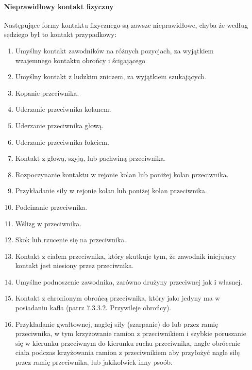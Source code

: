 \documentclass[12pt]{article}
\begin{document}
\paragraph{Nieprawidłowy kontakt fizyczny}
Następujące formy
kontaktu fizycznego są zawsze nieprawidłowe, chyba że według sędziego
był to kontakt przypadkowy:

\begin{enumerate}
	\item
	      Umyślny kontakt zawodników na różnych pozycjach, za wyjątkiem
	      wzajemnego kontaktu obrońcy i ścigającego
	\item
	      Umyślny kontakt z ludzkim zniczem, za wyjątkiem szukających.
	\item
	      Kopanie przeciwnika.
	\item
	      Uderzanie przeciwnika kolanem.
	\item
	      Uderzanie przeciwnika głową.
	\item
	      Uderzanie przeciwnika łokciem.
	\item
	      Kontakt z głową, szyją, lub pachwiną przeciwnika.
	\item
	      Rozpoczynanie kontaktu w rejonie kolan lub poniżej kolan przeciwnika.
	\item
	      Przykładanie siły w rejonie kolan lub poniżej kolan przeciwnika.
	\item
	      Podcinanie przeciwnika.
	\item
	      Wślizg w przeciwnika.
	\item
	      Skok lub rzucenie się na przeciwnika.
	\item
	      Kontakt z ciałem przeciwnika, który skutkuje tym, że zawodnik
	      inicjujący kontakt jest niesiony przez przeciwnika.
	\item
	      Umyślne podnoszenie zawodnika, zarówno drużyny przeciwnej jak i
	      własnej.
	\item
	      Kontakt z chronionym obrońcą przeciwnika, który jako jedyny ma w
	      posiadaniu kafla (patrz 7.3.3.2. Przywileje obrońcy).
	\item
	      Przykładanie gwałtownej, nagłej siły (szarpanie) do lub przez ramię
	      przeciwnika, w tym krzyżowanie ramion z przeciwnikiem i szybkie
	      poruszanie się w kierunku przeciwnym do kierunku ruchu przeciwnika,
	      nagłe obrócenie ciała podczas krzyżowania ramion z przeciwnikiem aby
	      przyłożyć nagle siłę przez ramię przeciwnika, lub jakikolwiek inny
	      psoób.
\end{enumerate}
\end{document}
